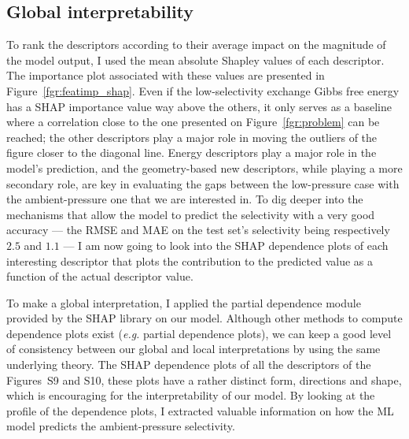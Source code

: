 \documentclass[main]{subfiles}
\begin{document}
\subsection{Global interpretability}

To rank the descriptors according to their average impact on the magnitude of the model output, I used the mean absolute Shapley values of each descriptor. The importance plot associated with these values are presented in Figure~\ref{fgr:featimp_shap}. Even if the low-selectivity exchange Gibbs free energy has a SHAP importance value way above the others, it only serves as a baseline where a correlation close to the one presented on Figure~\ref{fgr:problem} can be reached; the other descriptors play a major role in moving the outliers of the figure closer to the diagonal line. Energy descriptors play a major role in the model's prediction, and the geometry-based new descriptors, while playing a more secondary role, are key in evaluating the gaps between the low-pressure case with the ambient-pressure one that we are interested in. To dig deeper into the mechanisms that allow the model to predict the selectivity with a very good accuracy --- the RMSE and MAE on the test set's selectivity being respectively $2.5$ and $1.1$ --- I am now going to look into the SHAP dependence plots of each interesting descriptor that plots the contribution to the predicted value as a function of the actual descriptor value.

To make a global interpretation, I applied the partial dependence module provided by the SHAP library on our model. Although other methods to compute dependence plots exist (\emph{e.g.} partial dependence plots),\autocite{molnar2020interpretable} we can keep a good level of consistency between our global and local interpretations by using the same underlying theory. The SHAP dependence plots of all the descriptors of the Figures~S9 and S10, these plots have a rather distinct form, directions and shape, which is encouraging for the interpretability of our model. By looking at the profile of the dependence plots, I extracted valuable information on how the ML model predicts the ambient-pressure selectivity.
\end{document}
